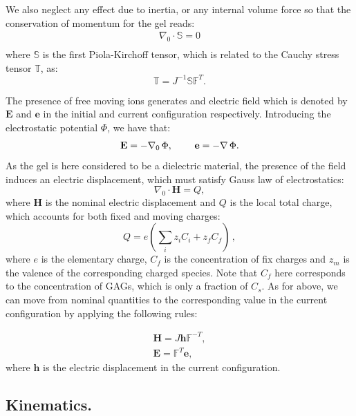 \documentclass[runningheads]{llncs}
\newcommand{\F}{\ensuremath{\mathbb{F}}}
\begin{document}
We also neglect any effect due to inertia, or any internal volume force so that the conservation of momentum for the gel reads:
\begin{gather}
\nabla_0 \cdot \mathbb{S}=0\\
\end{gather}
where $\mathbb{S}$ is the first Piola-Kirchoff tensor, which is related to the Cauchy stress tensor $\mathbb{T}$, as:
\begin{equation}
\mathbb{T} = J^{-1}\mathbb{S}\F^T.
\end{equation}

The presence of free moving ions generates and electric field which is denoted by $\mathbf{E}$ and $\mathbf{e}$ in the initial and current configuration respectively. Introducing the electrostatic potential $\Phi$, we have that:
\begin{equation}
\mathbf{E}= -\nabla_0 \, \Phi, \hspace{8mm} \mathbf{e}= - \nabla \, \Phi.
\end{equation}
As the gel is here considered to be a dielectric material, the presence of the field induces an electric displacement, which must satisfy Gauss law of electrostatics:
\begin{equation}
\nabla_0 \cdot \mathbf{H}= Q,
\label{gauss}
\end{equation}
where $\mathbf{H}$ is the nominal electric displacement and $Q$ is the local total charge, which accounts for both fixed and moving charges:
\begin{equation}
Q = e\left(\sum\limits_{i} z_i C_i+z_f C_{f}\right)\, , 
\end{equation}
where $e$ is the elementary charge, $C_f$ is the concentration of fix charges and $z_m$ is the valence of the corresponding charged species. Note that $C_f$ here corresponds to the concentration of GAGs, which is only a fraction of $C_s$. As for above, we can move from nominal quantities to the corresponding value in the current configuration by applying the following rules:

\begin{eqnarray}
\mathbf{H} = J \mathbf{h}\F^{-T},\\
\mathbf{E} = \F^T \mathbf{e},
\end{eqnarray}
where $\mathbf{h}$ is the electric displacement in the current configuration.

\subsection{Kinematics.}
\end{document}
